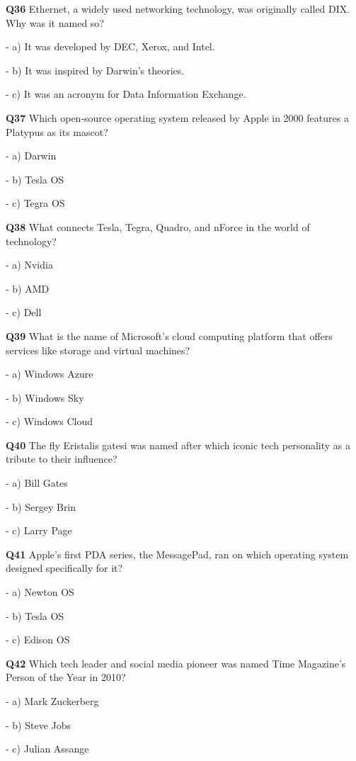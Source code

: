 \textbf{Q36} Ethernet, a widely used networking technology, was originally called DIX. Why was it named so?\par
\quad - a) It was developed by DEC, Xerox, and Intel.\par
\quad - b) It was inspired by Darwin's theories.\par
\quad - c) It was an acronym for Data Information Exchange.\par

\textbf{Q37} Which open‑source operating system released by Apple in 2000 features a Platypus as its mascot?\par
\quad - a) Darwin\par
\quad - b) Tesla OS\par
\quad - c) Tegra OS\par

\textbf{Q38} What connects Tesla, Tegra, Quadro, and nForce in the world of technology?\par
\quad - a) Nvidia\par
\quad - b) AMD\par
\quad - c) Dell\par

\textbf{Q39} What is the name of Microsoft's cloud computing platform that offers services like storage and virtual machines?\par
\quad - a) Windows Azure\par
\quad - b) Windows Sky\par
\quad - c) Windows Cloud\par

\textbf{Q40} The fly Eristalis gatesi was named after which iconic tech personality as a tribute to their influence?\par
\quad - a) Bill Gates\par
\quad - b) Sergey Brin\par
\quad - c) Larry Page\par

\textbf{Q41} Apple's first PDA series, the MessagePad, ran on which operating system designed specifically for it?\par
\quad - a) Newton OS\par
\quad - b) Tesla OS\par
\quad - c) Edison OS\par

\textbf{Q42} Which tech leader and social media pioneer was named Time Magazine's Person of the Year in 2010?\par
\quad - a) Mark Zuckerberg\par
\quad - b) Steve Jobs\par
\quad - c) Julian Assange\par

